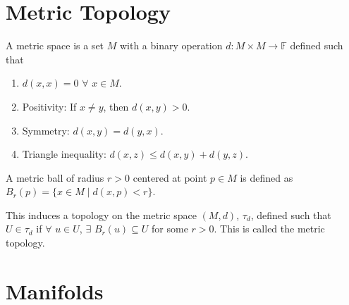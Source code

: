 \section{Metric Topology}
A metric space is a set $M$ with a binary operation $d: M\times M\rightarrow \mathbb{F}$ defined such that
\begin{enumerate}
	\item $d(x, x) = 0$ $\forall$ $x\in M$.
	\item Positivity: If $x\ne y$, then $d(x, y) > 0$.
	\item Symmetry: $d(x, y) = d(y, x)$.
	\item Triangle inequality: $d(x, z) \le d(x, y) + d(y, z)$.
\end{enumerate}
\begin{definition}[Ball]
	A metric ball of radius $r>0$ centered at point $p\in M$ is defined as $B_r(p)=\{x\in M\;|\;d(x, p)< r\}$.
\end{definition}
This induces a topology on the metric space $(M, d)$, $\tau_d$, defined such that $U\in\tau_d$ if $\forall$ $u\in U$, $\exists$ $B_r(u)\subseteq U$ for some $r>0$. This is called the metric topology.
\section{Manifolds}